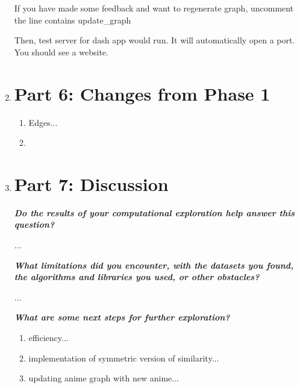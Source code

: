 \documentclass[12pt]{article}
\begin{document}
\begin{enumerate}
\begin{text}
If you have made some feedback and want to regenerate graph, uncomment the line contains update\_graph

Then, test server for dash app would run. It will automatically open a port. You should see a website.
\end{text}

\newpage

\item \section*{Part 6: Changes from Phase 1}

\begin{text}

\begin{enumerate}
    \item Edges...
    \item 
\end{enumerate}

\end{text}

\newpage

\item \section*{Part 7: Discussion}

\begin{text}


\emph{\textbf{Do the results of your computational exploration help answer this question?}}

...

\emph{\textbf{What limitations did you encounter, with the datasets you found, the algorithms and libraries you used, or other obstacles?}}

...

\emph{\textbf{What are some next steps for further exploration?}}

\begin{enumerate}
    \item efficiency...
    \item implementation of symmetric version of similarity...
    \item updating anime graph with new anime...
\end{enumerate}

\end{text}


\maketitle

\newpage




\end{enumerate}
\end{document}
